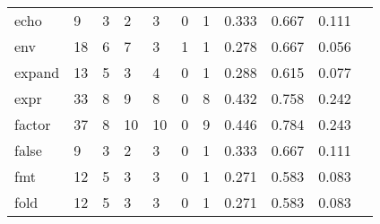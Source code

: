 \begin{longtable}{lp{1.10cm}p{1.10cm}p{1.10cm}p{1.10cm}p{1.10cm}p{1.10cm}p{1.10cm}p{1.10cm}p{1.10cm}p{1.10cm}}
echo      &                      9 &                                  3 &                                 2 &                                3 &                                 0 &                               1 &                          0.333 &                                 0.667 &                               0.111 \\
env       &                     18 &                                  6 &                                 7 &                                3 &                                 1 &                               1 &                          0.278 &                                 0.667 &                               0.056 \\
expand    &                     13 &                                  5 &                                 3 &                                4 &                                 0 &                               1 &                          0.288 &                                 0.615 &                               0.077 \\
expr      &                     33 &                                  8 &                                 9 &                                8 &                                 0 &                               8 &                          0.432 &                                 0.758 &                               0.242 \\
factor    &                     37 &                                  8 &                                10 &                               10 &                                 0 &                               9 &                          0.446 &                                 0.784 &                               0.243 \\
false     &                      9 &                                  3 &                                 2 &                                3 &                                 0 &                               1 &                          0.333 &                                 0.667 &                               0.111 \\
fmt       &                     12 &                                  5 &                                 3 &                                3 &                                 0 &                               1 &                          0.271 &                                 0.583 &                               0.083 \\
fold      &                     12 &                                  5 &                                 3 &                                3 &                                 0 &                               1 &                          0.271 &                                 0.583 &                               0.083 \\

\end{longtable}
